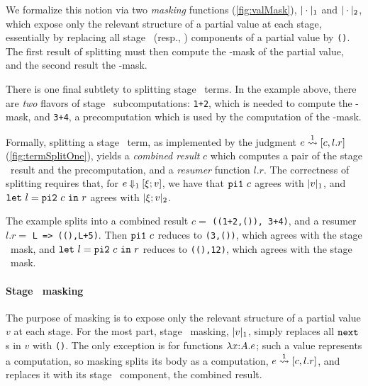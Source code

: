 

We formalize this notion via two \emph{masking} functions (\ref{fig:valMask}),
$|\cdot|_{ 1}$ and $|\cdot|_{ 2}$, which expose only the relevant structure of
a partial value at each stage, essentially by replacing all stage \bbone\
(resp., \bbtwo) components of a partial value by \texttt{()}. The first result
of splitting must then compute the \bbone-mask of the partial value, and the
second result the \bbtwo-mask. 

There is one final subtlety to splitting stage \bbone\ terms. In the example
above, there are \emph{two} flavors of stage \bbone\ subcomputations:
\texttt{1+2}, which is needed to compute the \bbone-mask, and \texttt{3+4},
a precomputation which is used by the computation of the \bbtwo-mask. 


Formally, splitting a stage \bbone\ term, as implemented by the judgment $e
\overset{ 1}\rightsquigarrow [c,l.r]$ (\ref{fig:termSplitOne}), yields a \emph{combined result}
$c$ which computes a pair of the stage \bbone\ result and the precomputation,
and a \emph{resumer} function $l.r$. The correctness of splitting requires that,
for $e\mathbin{{\Downarrow_{ 1}}}[\xi;v]$, we have that ${\tt pi1}~c$ agrees with
$|v|_{ 1}$, and ${\tt let}~{l} = {{\tt pi2}~c}~{\tt in}~{r}$ agrees with $|\xi;v|_{ 2}$.

The example splits into a combined result $c=$ \texttt{((1+2,()), 3+4)}, and a
resumer $l.r=$ \texttt{L => ((),L+5)}. Then ${\tt pi1}~c$ reduces to \texttt{(3,())},
which agrees with the stage \bbone\ mask, and ${\tt let}~{l} = {{\tt pi2}~c}~{\tt in}~{r}$ reduces to
\texttt{((),12)}, which agrees with the stage \bbtwo\ mask.

\paragraph{Stage \bbone\ masking}

The purpose of masking is to expose only the relevant structure of a partial
value $v$ at each stage. For the most part, stage \bbone\ masking, $|v|_{ 1}$,
simply replaces all ${\tt next}$s in $v$ with \texttt{()}. The only exception is for
functions $\lambda{x}\mathrm{:}{A}.{e}$; such a value represents a computation, so masking splits
its body as a computation, $e\overset{ 1}\rightsquigarrow [c,l.r]$, and replaces it with its
stage \bbone\ component, the combined result.

